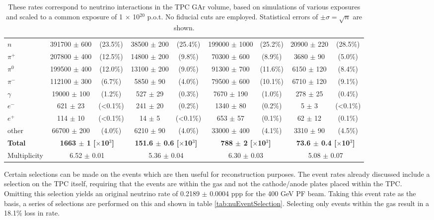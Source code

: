 \begin{table}
\begin{tabular}{| l ||cc|cc||cc|cc|}
	$n$ & 391700 $\pm$ 600 & (23.5\%) & 38500 $\pm$ 200 & (25.4\%) & 199000 $\pm$ 1000 & (25.2\%) & 20900 $\pm$ 220& (28.5\%) \\
	$\pi^{+}$ & 207800 $\pm$ 400 & (12.5\%) & 14800 $\pm$ 200 & (9.8\%) & 70300 $\pm$ 600 & (8.9\%) & 3680 $\pm$ 90& (5.0\%) \\
	$\pi^{0}$ & 199500 $\pm$ 400 & (12.0\%) & 13100 $\pm$ 200 & (9.0\%) & 91300 $\pm$ 700 & (11.6\%) & 6150 $\pm$ 120& (8.4\%)  \\
	$\pi^{-}$ & 112100 $\pm$ 300 & (6.7\%) & 5850 $\pm$ 90 & (4.0\%) & 79500 $\pm$ 600 & (10.1\%) & 6710 $\pm$ 120& (9.1\%) \\
	$\gamma$ & 19000 $\pm$ 100 & (1.2\%) & 527 $\pm$ 29 & (0.3\%) & 7670 $\pm$ 190 & (1.0\%) & 278 $\pm$ 25& (0.4\%)  \\
	$e^{-}$ & 621 $\pm$ 23 & (<0.1\%) & 241 $\pm$ 20 & (0.2\%) & 1340 $\pm$ 80 & (0.2\%) & 5 $\pm$ 3& (<0.1\%) \\
	$e^{+}$ & 114 $\pm$ 10 & (<0.1\%) & 14 $\pm$ 5 & (<0.1\%) &653 $\pm$ 57 & (0.1\%) & 62 $\pm$ 12& (0.1\%) \\
	other & 66700 $\pm$ 200 & (4.0\%) & 6210 $\pm$ 90 & (4.0\%) & 33000 $\pm$ 400 & (4.1\%) & 3310 $\pm$ 90 & (4.5\%) \\
	\hline
	\textbf{Total} & \multicolumn{2}{|c|}{\textbf{1663 $\pm$ 1 [$\times$10$^{3}$]}} & \multicolumn{2}{|c||}{\textbf{151.6 $\pm$ 0.6 [$\times$10$^{3}$]}} & \multicolumn{2}{|c|}{\textbf{788 $\pm$ 2 [$\times$10$^{3}$]}} & \multicolumn{2}{|c|}{\textbf{73.6 $\pm$ 0.4 [$\times$10$^{3}$]}}\\
	\hline
	Multiplicity & \multicolumn{2}{|c|}{6.52 $\pm$ 0.01} & \multicolumn{2}{|c||}{5.36 $\pm$ 0.04} & \multicolumn{2}{|c|}{6.30 $\pm$ 0.03} & \multicolumn{2}{|c|}{5.08 $\pm$ 0.07} \\
	\hline
	\hline
\end{tabular}
\caption{These rates correspond to neutrino interactions in the TPC GAr volume, based on simulations of various exposures and scaled to a common exposure of 1 $\times$ 10$^{20}$ p.o.t. No fiducial cuts are employed. Statistical errors of $\pm \sigma = \sqrt{n}$ are shown. }
\label{tab:neutrinoTPCRates}
\end{table}

Certain selections can be made on the events which are then useful for reconstruction purposes. The event rates already discussed include a selection on the TPC itself, requiring that the events are within the gas and not the cathode/anode plates placed within the TPC. Omitting this selection yields an original neutrino rate of 0.2189 $\pm$ 0.0004 ppp for the 400 GeV PF beam. Taking this event rate as the basis, a series of selections are performed on this and shown in table \ref{tab:nuEventSelection}. Selecting only events within the gas result in a 18.1\% loss in rate. 

